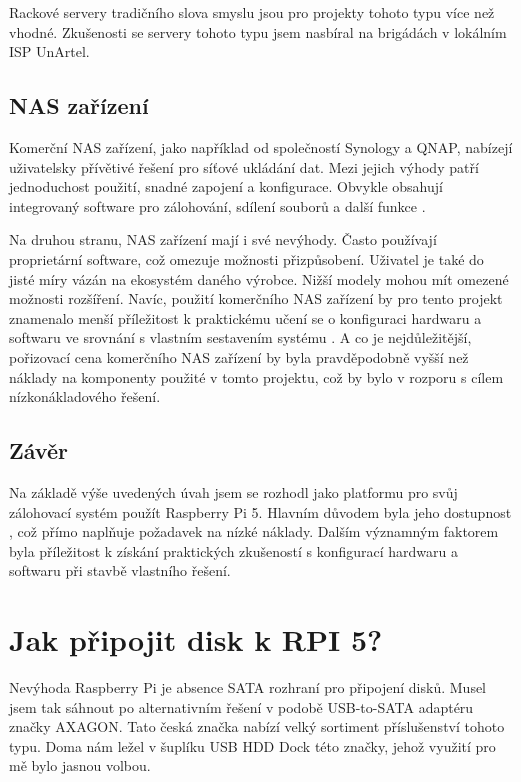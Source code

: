 \documentclass[a4paper,12pt, oneside]{book}
\begin{document}
Rackové servery tradičního slova smyslu jsou pro projekty tohoto typu
více než vhodné. Zkušenosti se servery tohoto typu
jsem nasbíral na brigádách v lokálním ISP UnArtel. 

\subsection{NAS zařízení}

Komerční NAS zařízení, jako například od společností Synology a QNAP, nabízejí
uživatelsky přívětivé řešení pro síťové ukládání dat. Mezi jejich výhody patří
jednoduchost použití, snadné zapojení a konfigurace. Obvykle obsahují
integrovaný software pro zálohování, sdílení souborů a další funkce .  

Na druhou stranu, NAS zařízení mají i své nevýhody. Často používají proprietární
software, což omezuje možnosti přizpůsobení. Uživatel je také do jisté míry
vázán na ekosystém daného výrobce. Nižší modely mohou mít omezené možnosti
rozšíření. Navíc, použití komerčního NAS zařízení by pro tento projekt znamenalo
menší příležitost k praktickému učení se o konfiguraci hardwaru a softwaru ve
srovnání s vlastním sestavením systému . A co je nejdůležitější, pořizovací cena
komerčního NAS zařízení by byla pravděpodobně vyšší než náklady na komponenty
použité v tomto projektu, což by bylo v rozporu s cílem nízkonákladového řešení.  

\subsection{Závěr}



Na základě výše uvedených úvah jsem se rozhodl jako platformu pro svůj
zálohovací systém použít Raspberry Pi 5. Hlavním důvodem byla jeho dostupnost
, což přímo naplňuje
požadavek na nízké náklady. Dalším významným faktorem byla příležitost k získání
praktických zkušeností s konfigurací hardwaru a softwaru při stavbě vlastního
řešení.


\section{Jak připojit disk k RPI 5?}

Nevýhoda Raspberry Pi je absence SATA rozhraní pro připojení disků.
Musel jsem tak sáhnout po alternativním řešení v podobě 
USB-to-SATA adaptéru značky AXAGON. Tato česká značka nabízí 
velký sortiment příslušenství tohoto typu. Doma nám ležel v šuplíku
USB HDD Dock této značky, jehož využití pro mě 
bylo jasnou volbou.
\end{document}
